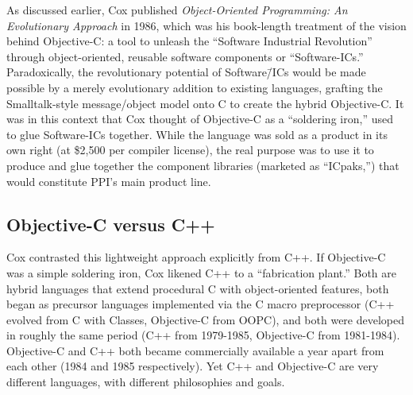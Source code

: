 \documentclass[acmsmall]{acmart}\settopmatter{}
\begin{document}
As discussed earlier, Cox published \emph{Object-Oriented Programming: An Evolutionary Approach} in 1986, which was his book-length treatment of the vision behind Objective-C: a tool to unleash the ``Software Industrial Revolution'' through object-oriented, reusable software components or ``Software-ICs.''  \citep{cox_object-oriented_1986} Paradoxically, the revolutionary potential of Software\=/ICs would be made possible by a merely evolutionary addition to existing languages, grafting the Smalltalk-style message/object model onto C to create the hybrid Objective-C. It was in this context that Cox thought of Objective-C as a ``soldering iron,'' used to glue Software-ICs together. While the language was sold as a product in its own right (at \$2,500 per compiler license), the real purpose was to use it to produce and glue together the component libraries (marketed as ``ICpaks,'') that would constitute PPI's main product line.
\subsection{Objective-C versus C++}
\label{subsec-ObjCvC++}
Cox contrasted this lightweight approach explicitly from C++. If Objective-C was a simple soldering iron, Cox likened C++ to a ``fabrication plant.'' \citep{cox_oral_2016}  Both are hybrid languages that extend procedural C with object-oriented features, both began as precursor languages implemented via the C macro preprocessor (C++ evolved from C with Classes, Objective-C from OOPC), and both were developed in roughly the same period (C++ from 1979-1985, Objective-C from 1981-1984). Objective-C and C++ both became commercially available a year apart from each other (1984 and 1985 respectively). Yet C++ and Objective-C are very different languages, with different philosophies and goals. 
\end{document}
